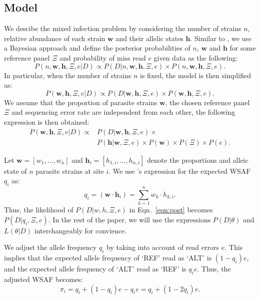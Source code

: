 \documentclass{bioinfo}
\begin{document}
\subsection{Model}
We descibe the mixed infection problem by considering the number of strains $n$, relative abundance of each strain $\mathbf{w}$ and their allelic states $\mathbf{h}$. Similar to \citet{Jack2016}, we use a Bayesian approach and define the posterior probabilities of $n$, $\mathbf{w}$ and $\mathbf{h}$ for some reference panel $\Xi$ and probability of miss read $e$ given data as the following:
$$P(n, \mathbf{w}, \mathbf{h}, \Xi, e |D) \propto P(D|n, \mathbf{w}, \mathbf{h}, \Xi, e) \times P(n, \mathbf{w}, \mathbf{h}, \Xi, e).
$$
In particular, when the number of strains $n$ is fixed, the model is then simplified as:
$$P(\mathbf{w}, \mathbf{h}, \Xi, e |D) \propto P(D|\mathbf{w}, \mathbf{h}, \Xi, e) \times P(\mathbf{w}, \mathbf{h}, \Xi, e).$$ We assume that the proportion of parasite strains $\mathbf{w}$, the chosen reference panel $\Xi$ and sequencing error rate are independent from each other, the following expression is then obtained:
\begin{equation}
\begin{split}
P(\mathbf{w}, \mathbf{h}, \Xi, e|D) \propto & P(D|\mathbf{w}, \mathbf{h}, \Xi, e) \times \\
                                            & P(\mathbf{h}|\mathbf{w}, \Xi, e) \times P(\mathbf{w}) \times P(\Xi) \times P(e).\label{eqn:post}
\end{split}
\end{equation}

Let $\mathbf w = [w_1,\dots, w_n]$ and $\mathbf{h}_i = [h_{1,i},\dots,h_{n,i}]$ denote the proportions and alleic state of $n$ parasite strains at site $i$. We use \citet{Jack2016}'s expression for the expected WSAF $q_{i}$ as:
\begin{equation}
q_i= (\mathbf{w}\cdot\mathbf{h}_{i})  =  \sum_{k=1}^{n} w_k \cdot h_{k,i} .\label{eqn:qij_full_sum}
\end{equation}
Thus, the likelihood of $P (D|w, h,\Xi, e)$ in Eqn.~\ref{eqn:post} becomes $P(D|q_{i},\Xi, e)$. In the rest of the paper, we will use the expressions $P(D|\theta)$ and $L(\theta|D)$ interchangeably for convience.

We adjust the allele frequency $q_i$ by taking into account of read errors $e$. This implies that the expected allele frequency of `REF' read as `ALT' is $(1 - q_i)e$, and the expected allele frequency of `ALT' read as `REF' is $q_ie$. Thus, the adjusted WSAF becomes:
\begin{equation}
\pi_i = q_i + (1 - q_i)e - q_ie = q_i + (1 - 2q_i)e.\label{eqn:adj_q}
\end{equation}
\end{document}
